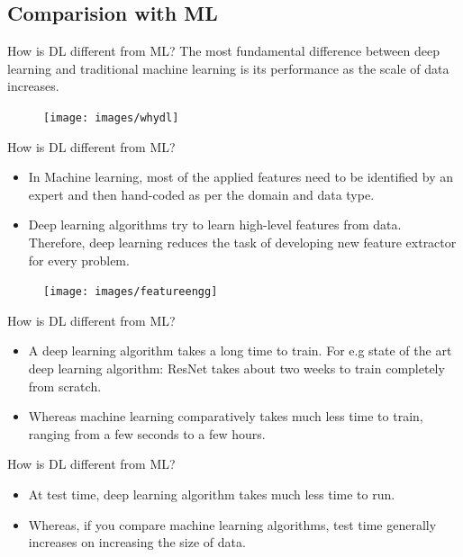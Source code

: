 \documentclass[10pt]{beamer}
\begin{document}
	\subsection{Comparision with ML}
	\begin{frame}{How is DL different from ML?}
		\large{The most fundamental difference between deep learning and
		traditional machine learning is its performance as the scale of
		data increases.}
		\begin{figure}
			\texttt{[image: images/whydl]}
		\end{figure}
	\end{frame}
	\begin{frame}{How is DL different from ML?}
		\large{\begin{itemize}
				\item<1> In Machine learning, most of the applied features need to be
				identified by an expert and then hand-coded as per the domain
				and data type.
				\item<2> Deep learning algorithms try to learn high-level
				features from data. Therefore, deep learning reduces the task
				of developing new feature extractor for every problem.
				\end{itemize}
		}
	 	\begin{figure}
	 		\texttt{[image: images/featureengg]}
	 	\end{figure}
	\end{frame}
	\begin{frame}{How is DL different from ML?}
		\large{\begin{itemize}
				\item<1> A deep learning algorithm takes a long time to train. For e.g
				state of the art deep learning algorithm: ResNet takes about
				two weeks to train completely from scratch.
				\item<2> Whereas machine learning comparatively takes much less time
				to train, ranging from a few seconds to a few hours.
			\end{itemize}
		}
	\end{frame}
	\begin{frame}{How is DL different from ML?}
			\large{\begin{itemize}
				\item<1> At test time, deep learning algorithm takes much less time to
				run.
				\item<2> Whereas, if you compare machine learning algorithms,
				test time generally increases on increasing the size of data.
			\end{itemize}
		}
	\end{frame}
\end{document}
